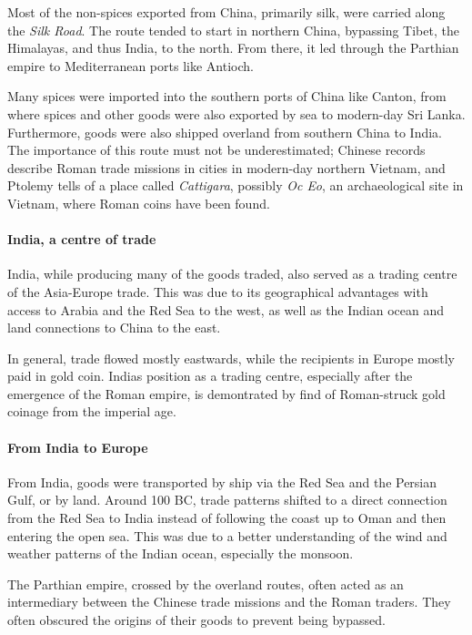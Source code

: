 \documentclass[11pt, a4paper, headings=standardclasses]{scrartcl}
\begin{document}
Most of the non-spices exported from China, primarily silk, were carried along the \emph{Silk Road}. The route tended to start in northern China, bypassing Tibet, the Himalayas, and thus India, to the north. From there, it led through the Parthian empire\autocite{SilkRome} to Mediterranean ports like Antioch.\autocite[Chapter 7, Maps 2 and 3]{Rome}

Many spices were imported into the southern ports of China like Canton, from where spices and other goods were also exported by sea to modern-day Sri Lanka. Furthermore, goods were also shipped overland from southern China to India.\autocite[Maps 4 and 5]{Rome} The importance of this route must not be underestimated; Chinese records describe Roman trade missions in cities in modern-day northern Vietnam, and Ptolemy tells of a place called \emph{Cattigara}, possibly \emph{Oc Eo}, an archaeological site in Vietnam, where Roman coins have been found.\autocite{OcEo}

\paragraph{India, a centre of trade}
India, while producing many of the goods traded, also served as a trading centre of the Asia-Europe trade. This was due to its geographical advantages with access to Arabia and the Red Sea to the west, as well as the Indian ocean and land connections to China to the east.

In general, trade flowed mostly eastwards, while the recipients in Europe mostly paid in gold coin. Indias position as a trading centre, especially after the emergence of the Roman empire, is demontrated by find of Roman-struck gold coinage from the imperial age.\autocite[100]{curtin_1984}\label{gold}

\paragraph{From India to Europe}

From India, goods were transported by ship via the Red Sea and the Persian Gulf, or by land.\autocite[96]{curtin_1984} Around 100 BC, trade patterns shifted to a direct connection from the Red Sea to India instead of following the coast up to Oman and then entering the open sea.\autocite[98]{curtin_1984} This was due to a better understanding of the wind and weather patterns of the Indian ocean, especially the monsoon.\autocite[97]{curtin_1984}

The Parthian empire, crossed by the overland routes, often acted as an intermediary between the Chinese trade missions and the Roman traders. They often obscured the origins of their goods to prevent being bypassed.\autocite{SilkRome}
\end{document}
